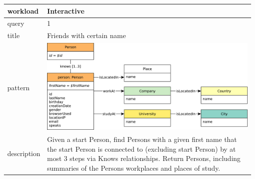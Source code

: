 \renewcommand*{\arraystretch}{1.1}

\noindent\begin{tabularx}{17cm}{|p{1.95cm}|X|}
	\hline
	workload    & Interactive \\ \hline
%
	query       & 1 \\ \hline
%
	title       & Friends with certain name \\ \hline
%
    pattern     & \hfill\includegraphics[scale=\patternscale,margin=0cm .2cm]{patterns/interactive01}\hfill\vadjust{} \\ \hline
%
	description & Given a start Person, find Persons with a given first name that the
start Person is connected to (excluding start Person) by at most 3 steps
via Knows relationships. Return Persons, including summaries of the
Persons workplaces and places of study.
 \\ \hline
	

\end{tabularx}
